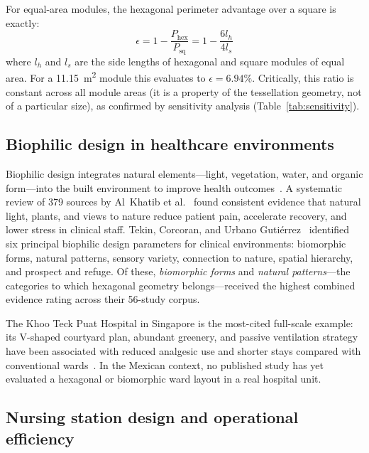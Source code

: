 \documentclass[12pt,a4paper]{article}
\begin{document}
For equal-area modules, the hexagonal perimeter advantage over a square is exactly:
\begin{equation}
  \epsilon = 1 - \frac{P_{\text{hex}}}{P_{\text{sq}}} = 1 - \frac{6l_h}{4l_s}
  \label{eq:efficiency}
\end{equation}
where $l_h$ and $l_s$ are the side lengths of hexagonal and square modules of
equal area.
For a \SI{11.15}{\metre\squared} module this evaluates to $\epsilon = 6.94\%$.
Critically, this ratio is constant across all module areas (it is a property of
the tessellation geometry, not of a particular size), as confirmed by sensitivity
analysis (Table~\ref{tab:sensitivity}).

\subsection{Biophilic design in healthcare environments}

Biophilic design integrates natural elements---light, vegetation, water, and
organic form---into the built environment to improve health outcomes~\cite{zhong2022biophilic,totaforti2018biophilic}.
A systematic review of 379 sources by Al~Khatib et al.~\cite{khatib2024biophilic}
found consistent evidence that natural light, plants, and views to nature reduce
patient pain, accelerate recovery, and lower stress in clinical staff.
Tekin, Corcoran, and Urbano Guti\'errez~\cite{telkin2023biophilic} identified
six principal biophilic design parameters for clinical environments:
biomorphic forms, natural patterns, sensory variety, connection to nature, spatial
hierarchy, and prospect and refuge.
Of these, \textit{biomorphic forms} and \textit{natural patterns}---the categories
to which hexagonal geometry belongs---received the highest combined evidence rating
across their 56-study corpus.

The Khoo Teck Puat Hospital in Singapore is the most-cited full-scale example:
its V-shaped courtyard plan, abundant greenery, and passive ventilation strategy
have been associated with reduced analgesic use and shorter stays compared with
conventional wards~\cite{yin2019biophilic}.
In the Mexican context, no published study has yet evaluated a hexagonal or
biomorphic ward layout in a real hospital unit.

\subsection{Nursing station design and operational efficiency}
\end{document}
